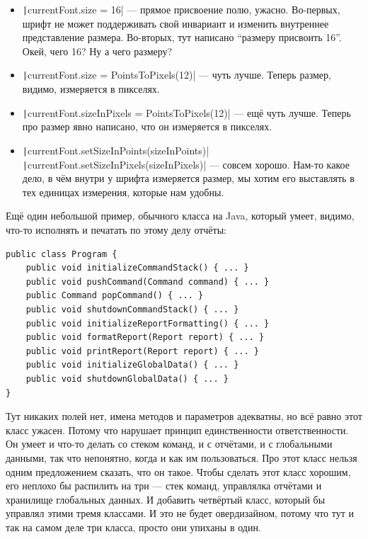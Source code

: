 \documentclass{../../text-style}
\begin{document}
\begin{itemize}
	\item \texttt|currentFont.size = 16| --- прямое присвоение полю, ужасно. Во-первых, шрифт не может поддерживать свой инвариант и изменить внутреннее представление размера. Во-вторых, тут написано ``размеру присвоить 16''. Окей, чего 16? Ну а чего размеру?
	\item \texttt|currentFont.size = PointsToPixels(12)| --- чуть лучше. Теперь размер, видимо, измеряется в пикселях.
	\item \texttt|currentFont.sizeInPixels = PointsToPixels(12)| --- ещё чуть лучше. Теперь про размер явно написано, что он измеряется в пикселях.
	\item \texttt|currentFont.setSizeInPoints(sizeInPoints)| \newline
			\texttt|currentFont.setSizeInPixels(sizeInPixels)| --- совсем хорошо. Нам-то какое дело, в чём внутри у шрифта измеряется размер, мы хотим его выставлять в тех единицах измерения, которые нам удобны.
\end{itemize}

Ещё один небольшой пример, обычного класса на Java, который умеет, видимо, что-то исполнять и печатать по этому делу отчёты:

\begin{verbatim}
public class Program {
    public void initializeCommandStack() { ... }
    public void pushCommand(Command command) { ... }
    public Command popCommand() { ... }
    public void shutdownCommandStack() { ... }
    public void initializeReportFormatting() { ... }
    public void formatReport(Report report) { ... }
    public void printReport(Report report) { ... }
    public void initializeGlobalData() { ... }
    public void shutdownGlobalData() { ... }
}
\end{verbatim}

Тут никаких полей нет, имена методов и параметров адекватны, но всё равно этот класс ужасен. Потому что нарушает принцип единственности ответственности. Он умеет и что-то делать со стеком команд, и с отчётами, и с глобальными данными, так что непонятно, когда и как им пользоваться. Про этот класс нельзя одним предложением сказать, что он такое. Чтобы сделать этот класс хорошим, его неплохо бы распилить на три --- стек команд, управлялка отчётами и хранилище глобальных данных. И добавить четвёртый класс, который бы управлял этими тремя классами. И это не будет овердизайном, потому что тут и так на самом деле три класса, просто они упиханы в один.
\end{document}
